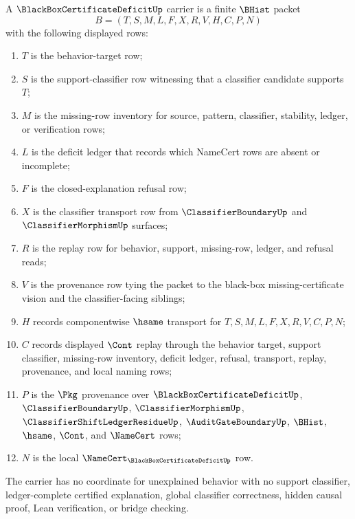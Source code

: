 \begin{definition}
\label{def:black-box-certificate-deficit-carrier}
A $\BlackBoxCertificateDeficitUp$ carrier is a finite $\BHist$ packet
$$
B=(T,S,M,L,F,X,R,V,H,C,P,N)
$$
with the following displayed rows:
\begin{enumerate}
\item $T$ is the behavior-target row;
\item $S$ is the support-classifier row witnessing that a classifier candidate supports $T$;
\item $M$ is the missing-row inventory for source, pattern, classifier, stability, ledger, or verification rows;
\item $L$ is the deficit ledger that records which NameCert rows are absent or incomplete;
\item $F$ is the closed-explanation refusal row;
\item $X$ is the classifier transport row from $\ClassifierBoundaryUp$ and $\ClassifierMorphismUp$ surfaces;
\item $R$ is the replay row for behavior, support, missing-row, ledger, and refusal reads;
\item $V$ is the provenance row tying the packet to the black-box missing-certificate vision and the classifier-facing siblings;
\item $H$ records componentwise $\hsame$ transport for $T,S,M,L,F,X,R,V,C,P,N$;
\item $C$ records displayed $\Cont$ replay through the behavior target, support classifier, missing-row inventory, deficit ledger, refusal, transport, replay, provenance, and local naming rows;
\item $P$ is the $\Pkg$ provenance over $\BlackBoxCertificateDeficitUp$, $\ClassifierBoundaryUp$, $\ClassifierMorphismUp$, $\ClassifierShiftLedgerResidueUp$, $\AuditGateBoundaryUp$, $\BHist$, $\hsame$, $\Cont$, and $\NameCert$ rows;
\item $N$ is the local $\NameCert_{\BlackBoxCertificateDeficitUp}$ row.
\end{enumerate}
The carrier has no coordinate for unexplained behavior with no support classifier, ledger-complete certified explanation, global classifier correctness, hidden causal proof, Lean verification, or bridge checking.
\end{definition}

